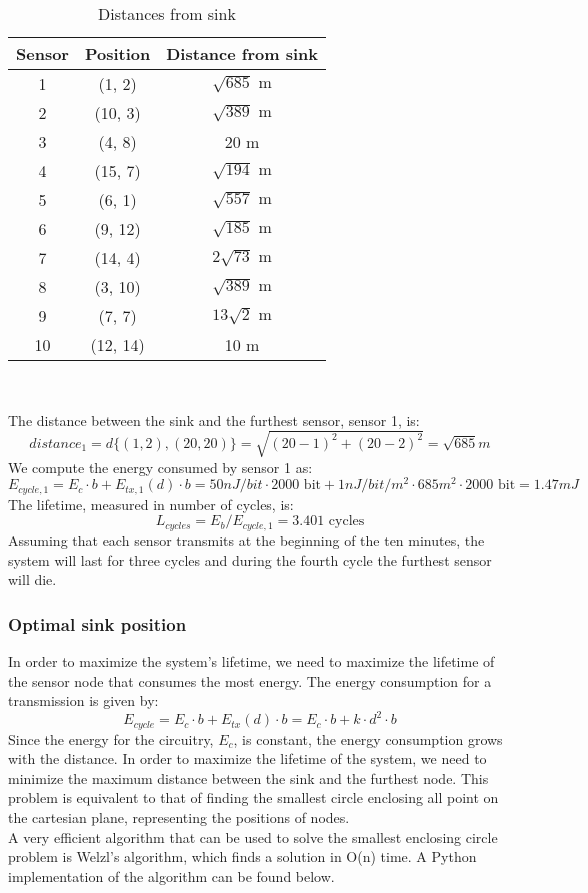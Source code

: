 \begin{table}[H]
\centering 
\begin{tabular}{| c | c | c |}
	\hline 
	\rowcolor{bluepoli!40}
	\textbf{Sensor} & \textbf{Position} & \textbf{Distance from sink}\T\B \\
	\hline 
	1 & (1, 2) & $\sqrt{685} \text{ m}$ \T\B\\
	2 &(10, 3) & $\sqrt{389} \text{ m}$ \T\B\\
	3 & (4, 8) & 20 m\T\B\\
	4 & (15, 7) & $\sqrt{194} \text{ m}$ \T\B\\
	5  & (6, 1) & $\sqrt{557} \text{ m}$ \T\B\\
	6  & (9, 12) & $\sqrt{185} \text{ m}$ \T\B\\
	7  & (14, 4) & $2\sqrt{73} \text{ m}$ \T\B\\
	8  & (3, 10) & $\sqrt{389} \text{ m}$ \T\B\\
	9  & (7, 7) & $13\sqrt{2} \text{ m}$ \T\B\\
	10  & (12, 14) & 10 m\T\B\\
	\hline
\end{tabular}
\\[10pt]
\caption{Distances from sink}
\end{table}

The distance between the sink and the furthest sensor, sensor 1, is: 
\[ 
distance_1 = d \{(1, 2) , (20, 20)\} = \sqrt{(20-1)^2 + (20-2)^2} = \sqrt{685} m 
\]
We compute the energy consumed by sensor 1 as:
\[
E_{cycle, 1} = E_c \cdot b + E_{tx, 1}(d) \cdot b = 50 nJ/bit \cdot 2000 \text{ bit} + 1 nJ/bit/m^2 \cdot 685 m^2 \cdot 2000 \text{ bit} = 1.47 mJ
\]
The lifetime, measured in number of cycles, is:
\[
L_{cycles} = E_b / E_{cycle, 1} = 3.401 \text{ cycles}
\]
Assuming that each sensor transmits at the beginning of the ten minutes, the system will last for three cycles and during the fourth cycle the furthest sensor will die.

\subsubsection{Optimal sink position}
In order to maximize the system's lifetime, we need to maximize the lifetime of the sensor node that consumes the most energy. The energy consumption for a transmission is given by:
\[
E_{cycle} = E_c \cdot b + E_{tx}(d) \cdot b = E_c \cdot b + k \cdot d^2 \cdot b
\]
Since the energy for the circuitry, $E_c$, is constant, the energy consumption grows with the distance. In order to maximize the lifetime of the system, we need to minimize the maximum distance between the sink and the furthest node. This problem is equivalent to that of finding the smallest circle enclosing all point on the cartesian plane, representing the positions of nodes.\\
A very efficient algorithm that can be used to solve the smallest enclosing circle problem is Welzl's algorithm, which finds a solution in O(n) time. A Python implementation of the algorithm can be found below.

